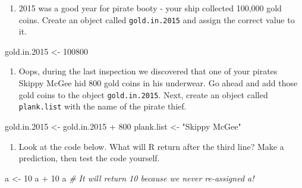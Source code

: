 \documentclass[]{book}
\newenvironment{Shaded}{\begin{snugshade}}{\end{snugshade}}
\newcommand{\DecValTok}[1]{\textcolor[rgb]{0.00,0.00,0.81}{{#1}}}
\newcommand{\FloatTok}[1]{\textcolor[rgb]{0.00,0.00,0.81}{{#1}}}
\newcommand{\StringTok}[1]{\textcolor[rgb]{0.31,0.60,0.02}{{#1}}}
\newcommand{\CommentTok}[1]{\textcolor[rgb]{0.56,0.35,0.01}{\textit{{#1}}}}
\newcommand{\NormalTok}[1]{{#1}}
\providecommand{\tightlist}{%
  \setlength{\itemsep}{0pt}\setlength{\parskip}{0pt}}
\theoremstyle{definition}
\theoremstyle{definition}
\theoremstyle{remark}
\begin{document}
\begin{enumerate}
\def\labelenumi{\arabic{enumi}.}
\setcounter{enumi}{2}
\tightlist
\item
  2015 was a good year for pirate booty - your ship collected 100,000
  gold coins. Create an object called \texttt{gold.in.2015} and assign
  the correct value to it.
\end{enumerate}

\begin{Shaded}
\begin{Highlighting}[]
\NormalTok{gold.in}\FloatTok{.2015} \NormalTok{<-}\StringTok{ }\DecValTok{100800}
\end{Highlighting}
\end{Shaded}

\begin{enumerate}
\def\labelenumi{\arabic{enumi}.}
\setcounter{enumi}{3}
\tightlist
\item
  Oops, during the last inspection we discovered that one of your
  pirates Skippy McGee hid 800 gold coins in his underwear. Go ahead and
  add those gold coins to the object \texttt{gold.in.2015}. Next, create
  an object called \texttt{plank.list} with the name of the pirate
  thief.
\end{enumerate}

\begin{Shaded}
\begin{Highlighting}[]
\NormalTok{gold.in}\FloatTok{.2015} \NormalTok{<-}\StringTok{ }\NormalTok{gold.in}\FloatTok{.2015} \NormalTok{+}\StringTok{ }\DecValTok{800}
\NormalTok{plank.list <-}\StringTok{ "Skippy McGee"}
\end{Highlighting}
\end{Shaded}

\begin{enumerate}
\def\labelenumi{\arabic{enumi}.}
\setcounter{enumi}{4}
\tightlist
\item
  Look at the code below. What will R return after the third line? Make
  a prediction, then test the code yourself.
\end{enumerate}

\begin{Shaded}
\begin{Highlighting}[]
\NormalTok{a <-}\StringTok{ }\DecValTok{10}
\NormalTok{a +}\StringTok{ }\DecValTok{10}
\NormalTok{a       }\CommentTok{# It will return 10 because we never re-assigned a!}
\end{Highlighting}
\end{Shaded}
\end{document}
